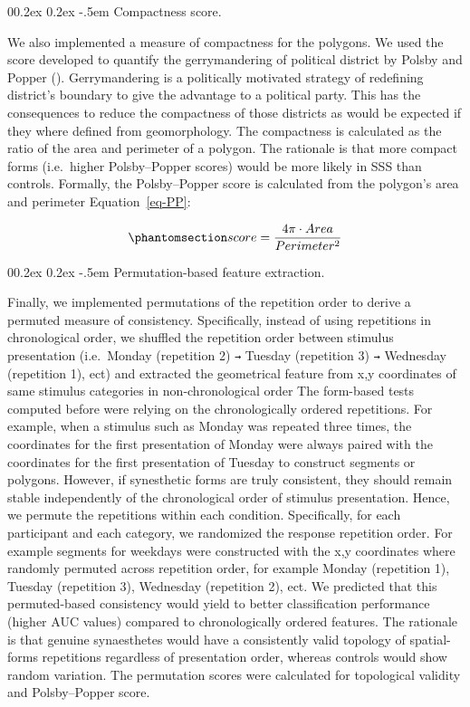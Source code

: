 \documentclass[
  man,
  longtable,
  a4paper,
  nolmodern,
  notxfonts,
  notimes,
  colorlinks=true,linkcolor=blue,citecolor=blue,urlcolor=blue]{apa7}
\makeatletter
\renewcommand{\paragraph}{\@startsection{paragraph}{4}{\parindent}%
	{0\baselineskip \@plus 0.2ex \@minus 0.2ex}%
	{-.5em}%
	{\normalfont\normalsize\bfseries\typesectitle}}
\makeatother
\begin{document}
\paragraph{Compactness score.}\label{compactness-score}

We also implemented a measure of compactness for the polygons. We used
the score developed to quantify the gerrymandering of political district
by Polsby and Popper (). Gerrymandering
is a politically motivated strategy of redefining district's boundary to
give the advantage to a political party. This has the consequences to
reduce the compactness of those districts as would be expected if they
where defined from geomorphology. The compactness is calculated as the
ratio of the area and perimeter of a polygon. The rationale is that more
compact forms (i.e.~higher Polsby--Popper scores) would be more likely
in SSS than controls. Formally, the Polsby--Popper score is calculated
from the polygon's area and perimeter Equation~\ref{eq-PP}:

\begin{equation}\phantomsection\label{eq-PP}{
score = \frac{4\pi \cdot Area}{Perimeter^2}
}\end{equation}

\paragraph{Permutation-based feature
extraction.}\label{permutation-based-feature-extraction}

Finally, we implemented permutations of the repetition order to derive a
permuted measure of consistency. Specifically, instead of using
repetitions in chronological order, we shuffled the repetition order
between stimulus presentation (i.e.~Monday (repetition 2) \texttt{→}
Tuesday (repetition 3) \texttt{→} Wednesday (repetition 1), ect) and
extracted the geometrical feature from x,y coordinates of same stimulus
categories in non-chronological order The form-based tests computed
before were relying on the chronologically ordered repetitions. For
example, when a stimulus such as Monday was repeated three times, the
coordinates for the first presentation of Monday were always paired with
the coordinates for the first presentation of Tuesday to construct
segments or polygons. However, if synesthetic forms are truly
consistent, they should remain stable independently of the chronological
order of stimulus presentation. Hence, we permute the repetitions within
each condition. Specifically, for each participant and each category, we
randomized the response repetition order. For example segments for
weekdays were constructed with the x,y coordinates where randomly
permuted across repetition order, for example Monday (repetition 1),
Tuesday (repetition 3), Wednesday (repetition 2), ect. We predicted that
this permuted-based consistency would yield to better classification
performance (higher AUC values) compared to chronologically ordered
features. The rationale is that genuine synaesthetes would have a
consistently valid topology of spatial-forms repetitions regardless of
presentation order, whereas controls would show random variation. The
permutation scores were calculated for topological validity and
Polsby--Popper score.
\end{document}
